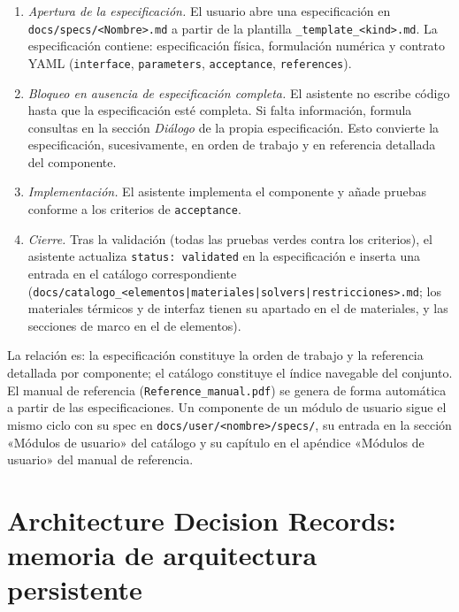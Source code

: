 \documentclass[11pt,oneside]{report}
\begin{document}
\begin{enumerate}
  \item \textit{Apertura de la especificación.} El usuario abre una especificación en \texttt{docs/\allowbreak{}specs/\allowbreak{}\textless{}Nombre\textgreater{}.\allowbreak{}md} a partir de la plantilla \texttt{\_\allowbreak{}template\_\allowbreak{}\textless{}kind\textgreater{}.\allowbreak{}md}. La especificación contiene: especificación física, formulación numérica y contrato YAML (\texttt{interface}, \texttt{parameters}, \texttt{acceptance}, \texttt{references}).
  \item \textit{Bloqueo en ausencia de especificación completa.} El asistente no escribe código hasta que la especificación esté completa. Si falta información, formula consultas en la sección \textit{Diálogo} de la propia especificación. Esto convierte la especificación, sucesivamente, en orden de trabajo y en referencia detallada del componente.
  \item \textit{Implementación.} El asistente implementa el componente y añade pruebas conforme a los criterios de \texttt{acceptance}.
  \item \textit{Cierre.} Tras la validación (todas las pruebas verdes contra los criterios), el asistente actualiza \texttt{status: validated} en la especificación e inserta una entrada en el catálogo correspondiente (\texttt{docs/\allowbreak{}catalogo\_\allowbreak{}\textless{}elementos|materiales|solvers|restricciones\textgreater{}.\allowbreak{}md}; los materiales térmicos y de interfaz tienen su apartado en el de materiales, y las secciones de marco en el de elementos).
\end{enumerate}

La relación es: la especificación constituye la orden de trabajo y la referencia detallada por componente; el catálogo constituye el índice navegable del conjunto. El manual de referencia (\texttt{Reference\_\allowbreak{}manual.\allowbreak{}pdf}) se genera de forma automática a partir de las especificaciones. Un componente de un módulo de usuario sigue el mismo ciclo con su spec en \texttt{docs/\allowbreak{}user/\allowbreak{}\textless{}nombre\textgreater{}/\allowbreak{}specs/\allowbreak{}}, su entrada en la sección «Módulos de usuario» del catálogo y su capítulo en el apéndice «Módulos de usuario» del manual de referencia.

\section{Architecture Decision Records: memoria de arquitectura persistente}
\end{document}
